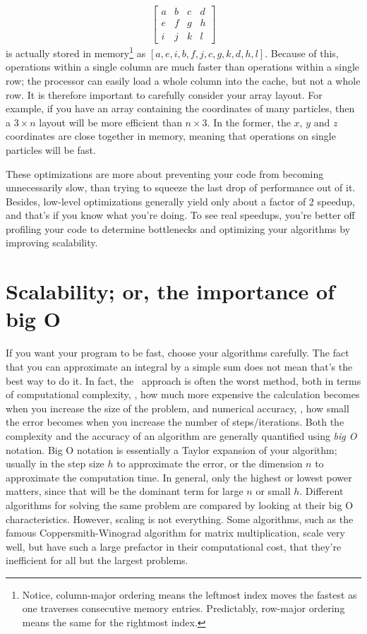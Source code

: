 \begin{itemize}
\begin{equation*}
    \begin{bmatrix}
        a & b & c & d \\
        e & f & g & h \\
        i & j & k & l
    \end{bmatrix}
    \end{equation*}
    is actually stored in memory\footnote{Notice, column-major ordering means the leftmost index moves the fastest as one traverses consecutive memory entries. Predictably, row-major ordering means the same for the rightmost index.} as $\left[a,e,i,b,f,j,c,g,k,d,h,l\right]$.
    Because of this, operations within a single column are much faster than operations within a single row; the processor can easily load a whole column into the cache, but not a whole row.
    It is therefore important to carefully consider your array layout.
    For example, if you have an array containing the coordinates of many particles, then a $3\times n$ layout will be more efficient than $n\times 3$.
    In the former, the $x$, $y$ and $z$ coordinates are close together in memory, meaning that operations on single particles will be fast.
\end{itemize}
These optimizations are more about preventing your code from becoming unnecessarily slow, than trying to squeeze the last drop of performance out of it.
Besides, low-level optimizations generally yield only about a factor of 2 speedup, and that's if you know what you're doing.
To see real speedups, you're better off profiling your code to determine bottlenecks and optimizing your algorithms by improving scalability.

\section{Scalability; or, the importance of big O}

If you want your program to be fast, choose your algorithms carefully.
The fact that you can approximate an integral by a simple sum does not mean that's the best way to do it.
In fact, the \naive\ approach is often the worst method, both in terms of computational complexity, \ie, how much more expensive the calculation becomes when you increase the size of the problem, and numerical accuracy, \ie, how small the error becomes when you increase the number of steps/iterations.
Both the complexity and the accuracy of an algorithm are generally quantified using \emph{big O} notation.
Big O notation is essentially a Taylor expansion of your algorithm; usually in the step size $h$ to approximate the error, or the dimension $n$ to approximate the computation time.
In general, only the highest or lowest power matters, since that will be the dominant term for large $n$ or small $h$.
Different algorithms for solving the same problem are compared by looking at their big O characteristics.
However, scaling is not everything.
Some algorithms, such as the famous Coppersmith-Winograd algorithm for matrix multiplication, scale very well, but have such a large prefactor in their computational cost, that they're inefficient for all but the largest problems.

